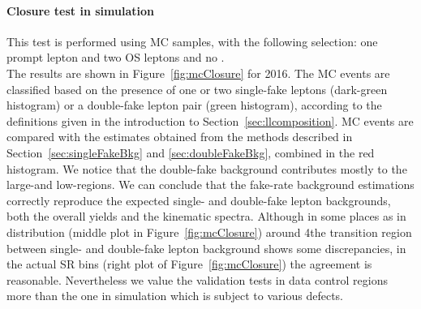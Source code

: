 \paragraph{Closure test in simulation}
This test is performed using \ttbar MC samples, with the
following selection: one prompt lepton and two OS \displ leptons and no \PQb.\\
The results are shown in Figure~\ref{fig:mcClosure} for 2016. The MC
events are 
classified based on the presence of one or two single-fake leptons
(dark-green histogram) or a double-fake lepton pair (green histogram),
according to the definitions given in the introduction to
Section~\ref{sec:llcomposition}. MC events are compared with the estimates
obtained from the \fr methods described in
Section~\ref{sec:singleFakeBkg}
and \ref{sec:doubleFakeBkg}, combined in the red histogram.
We notice that the double-fake background contributes mostly to
the large-\Deltwod and low-\mtwol regions. We can conclude that the
fake-rate background estimations correctly reproduce the expected
single- and double-fake lepton backgrounds, both the overall yields and the
kinematic spectra. 
Although in some places as in \mtwol distribution
(middle plot in Figure~\ref{fig:mcClosure}) around 4\GeV the transition region between
single- and double-fake lepton background shows some discrepancies, in the
actual SR bins (right plot of Figure~\ref{fig:mcClosure}) the agreement is
reasonable. Nevertheless we value the validation tests in data
control regions more than the one in simulation which is subject to
various defects. \\
